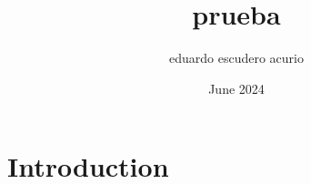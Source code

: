 \documentclass{article}
\title{prueba}
\author{eduardo escudero acurio}
\date{June 2024}
\begin{document}
\maketitle

\section{Introduction}
\end{document}
